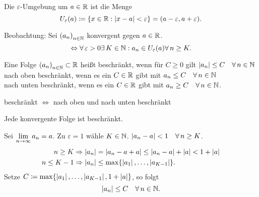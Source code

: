 \documentclass[../ana1.tex]{subfiles}
\begin{document}
\begin{defi}
	Die \(\varepsilon \)-Umgebung um \(a\in\mathbb{R} \) ist die Menge
	\[U_\varepsilon(a)\coloneqq \{x\in\mathbb{R}: \left|x-a\right| <\varepsilon \} = (a-\varepsilon, a+\varepsilon). \]
\end{defi}

Beobachtung: Sei \({(a_n)}_{n\in\mathbb{N}} \) konvergent gegen \(a\in\mathbb{R} \).
\[\Leftrightarrow \forall\varepsilon >0 \exists K\in\N: a_n \in U_\varepsilon(a) \forall n\geq K. \]

\begin{defi}
	Eine Folge \({(a_n)}_{n\in\mathbb{N}} \subset \mathbb{R} \) heißt beschränkt, wenn für \(C\geq 0 \) gilt \(\abs{a_n}\leq C \quad \forall n\in\N \) \\
	nach oben beschränkt, wenn es ein \(C\in\mathbb{R} \) gibt mit \(a_n\leq C \quad \forall n\in\N \) \\
	nach unten beschränkt, wenn es ein \(C\in\mathbb{R} \) gibt mit \(a_n\geq C \quad \forall n\in\N \).
\end{defi}

\begin{bem}
	beschränkt \(\Leftrightarrow \) nach oben und nach unten beschränkt
\end{bem}

\begin{satz}
	Jede konvergente Folge ist beschränkt.
\end{satz}
\begin{bew}
	Sei \(\lim\limits_{n\rightarrow\infty} a_n = a \). Zu \(\varepsilon = 1 \) wähle \(K\in\mathbb{N} \).
	\(\abs{a_n-a}<1 \quad \forall n\geq K \).
	\begin{align*}
		n\geq K &\Rightarrow \left|a_n\right| = \left|a_n -a+a\right| \leq \left|a_n -a\right| + \left|a\right| < 1 + \left|a\right|\\
		n\leq K-1 &\Rightarrow \left|a_n\right| \leq \max \{\left|a_1\right|,\ldots,\left|a_{K-1}\right|\}.
	\end{align*}
	Setze \(C\coloneqq \max \{\left|a_1\right|,\ldots,\left|a_{K-1}\right|, 1 + \left|a\right|\} \), so folgt
	\[\abs{a_n} \leq C \quad\forall n\in\N. \]
\end{bew}
\end{document}
